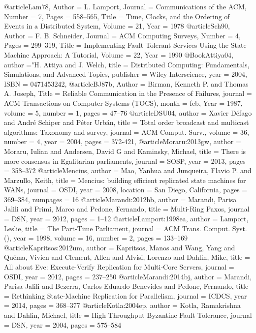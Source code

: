 @article{Lam78,
Author    = {L. Lamport},
Journal   = {Communications of the ACM},
Number    = {7},
Pages     = {558--565},
Title     = {Time, Clocks, and the Ordering of Events in a Distributed System},
Volume    = {21},
Year      = {1978}
}
@article{Sch90,
Author    = {F. B. Schneider},
Journal   = {ACM Computing Surveys},
Number    = {4},
Pages     = {299--319},
Title     = {Implementing Fault-Tolerant Services Using the State Machine Approach: {A} Tutorial},
Volume    = {22},
Year      = {1990}
}
@Book{Attiya04,
author    ={"H. Attiya and J. Welch},
title     =	{Distributed Computing: Fundamentals, Simulations, and Advanced Topics},
publisher =	{Wiley-Interscience},
year      =  {2004},
ISBN      = 	{0471453242},
}
@article{BJ87b,
Author    = {Birman, Kenneth P. and Thomas A. Joseph},
Title     = {Reliable Communication in the Presence of Failures},
journal   = {ACM Transactions on Computer Systems (TOCS)},
month     = {feb},
Year      = {1987},
volume    = {5},
number    = {1},
pages     = {47--76}
}
@article{DSU04,
author    = {Xavier D{\'e}fago and Andr{\'e} Schiper and P{\'e}ter Urb{\'a}n},
title     = {Total order broadcast and multicast algorithms: Taxonomy and survey},
journal   = {ACM Comput. Surv.},
volume    = {36},
number    = {4},
year      = {2004},
pages     = {372-421},
}
@article{Moraru:2013gw,
author    = {Moraru, Iulian and Andersen, David G and Kaminsky, Michael},
title     = {{There is more consensus in Egalitarian parliaments}},
journal   = {SOSP},
year      = {2013},
pages     = {358--372}
}
@article{Mencius,
author    = {Mao, Yanhua and Junqueira, Flavio P. and Marzullo, Keith},
title     = {Mencius: building efficient replicated state machines for WANs},
journal   = {OSDI},
year      = {2008},
location  = {San Diego, California},
pages     = {369--384},
numpages  = {16}
}
@article{Marandi:2012hb,
author    = {Marandi, Parisa Jalili and Primi, Marco and Pedone, Fernando},
title     = {{Multi-Ring Paxos}},
journal   = {DSN},
year      = {2012},
pages     = {1--12}
}
@article{Lamport:1998ea,
author    = {Lamport, Leslie},
title     = {{The Part-Time Parliament}},
journal   = {ACM Trans. Comput. Syst. ()},
year      = {1998},
volume    = {16},
number    = {2},
pages     = {133--169}
}
@article{Kapritsos:2012um,
author    = {Kapritsos, Manos and Wang, Yang and Qu{\'e}ma, Vivien and Clement, Allen and Alvisi, Lorenzo and Dahlin, Mike},
title     = {{All about Eve: Execute-Verify Replication for Multi-Core Servers}},
journal   = {OSDI},
year      = {2012},
pages     = {237--250}
}
@article{Marandi:2014bj,
author    = {Marandi, Parisa Jalili and Bezerra, Carlos Eduardo Benevides and Pedone, Fernando},
title     = {{Rethinking State-Machine Replication for Parallelism}},
journal   = {ICDCS},
year      = {2014},
pages     = {368--377}
}
@article{Kotla:2004ep,
author    = {Kotla, Ramakrishna and Dahlin, Michael},
title     = {{High Throughput Byzantine Fault Tolerance}},
journal   = {DSN},
year      = {2004},
pages     = {575--584}
}

